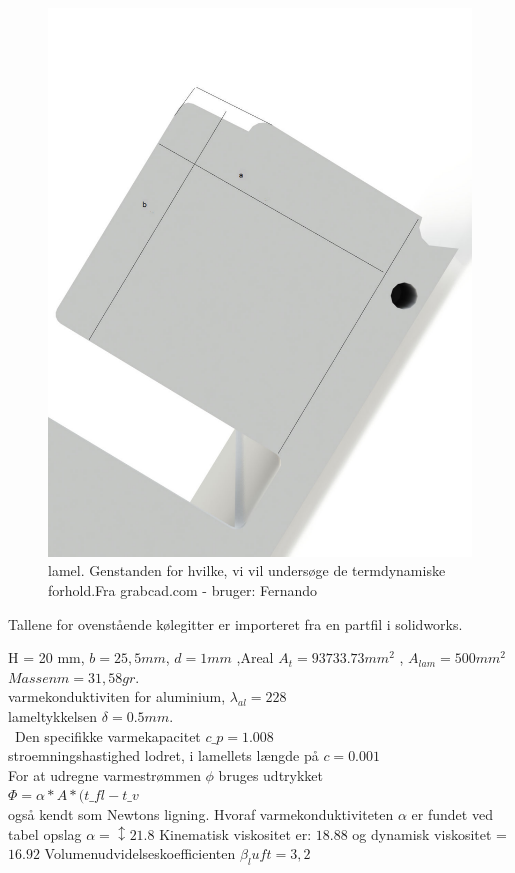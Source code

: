 \begin{figure}
	\centering
	\includegraphics[width=0.7\linewidth]{billeder/lamel}
	\caption{lamel. Genstanden for hvilke, vi vil undersøge de termdynamiske forhold.Fra grabcad.com - bruger: Fernando}
	\label{fig:lamel}
\end{figure}



Tallene for ovenstående kølegitter er importeret fra en partfil i solidworks. %

H = 20 mm, $b = 25,5 mm$, $d  =1 mm$ ,Areal $A_t = 93733.73 mm^2$ , $A_{lam}= 500 mm^2$  \\ $Massen m = 31,58 gr.$ \\
varmekonduktiviten for aluminium, $\lambda_{al} = 228$ \\  
lameltykkelsen $\delta = 0.5 mm.$  \\\
Den specifikke varmekapacitet $c\_p = 1.008$ \\
stroemningshastighed lodret, i lamellets længde på $c = 0.001$ \\



For at udregne varmestrømmen $\phi$  bruges udtrykket \\ $\Phi = \alpha * A* (t\_{fl}-t\_v$ \\  også kendt som Newtons ligning. 
Hvoraf varmekonduktiviteten $\alpha$ er fundet ved tabel opslag $\alpha = ↕21.8$
Kinematisk viskositet er: $18.88$ og dynamisk viskositet = $16.92$ 
Volumenudvidelseskoefficienten $\beta_luft = 3,2$
 
